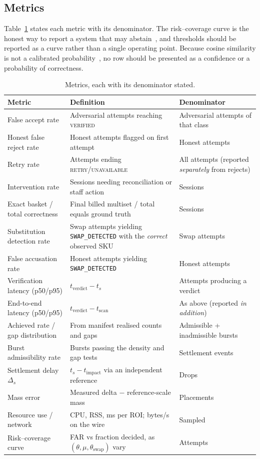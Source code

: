 \documentclass[conference]{IEEEtran}
\begin{document}
\subsection{Metrics}
Table~\ref{tab:metrics} states each metric with its denominator. The risk--coverage curve is the
honest way to report a system that may abstain~\cite{R61}, and thresholds should be reported as a
curve rather than a single operating point. Because cosine similarity is not a calibrated
probability~\cite{R60}, no row should be presented as a confidence or a probability of correctness.

\begin{table}[!t]
\caption{Metrics, each with its denominator stated.}
\label{tab:metrics}
\centering
\footnotesize
\renewcommand{\arraystretch}{1.15}
\begin{tabular}{@{}p{}p{}p{}@{}}
\toprule
Metric & Definition & Denominator \\
\midrule
False accept rate & Adversarial attempts reaching \textsc{verified} & Adversarial attempts of that class \\
Honest false reject rate & Honest attempts flagged on first attempt & Honest attempts \\
Retry rate & Attempts ending \textsc{retry}/\textsc{unavailable} & All attempts (reported \emph{separately} from rejects) \\
Intervention rate & Sessions needing reconciliation or staff action & Sessions \\
Exact basket / total correctness & Final billed multiset / total equals ground truth & Sessions \\
Substitution detection rate & Swap attempts yielding \texttt{SWAP\_DETECTED} with the \emph{correct} observed SKU & Swap attempts \\
False accusation rate & Honest attempts yielding \texttt{SWAP\_DETECTED} & Honest attempts \\
Verification latency (p50/p95) & $t_{\mathrm{verdict}}-t_s$ & Attempts producing a verdict \\
End-to-end latency (p50/p95) & $t_{\mathrm{verdict}}-t_{\mathrm{scan}}$ & As above (reported \emph{in addition}) \\
Achieved rate / gap distribution & From manifest realised counts and gaps & Admissible + inadmissible bursts \\
Burst admissibility rate & Bursts passing the density and gap tests & Settlement events \\
Settlement delay $\Delta_s$ & $t_s - t_{\mathrm{impact}}$ via an independent reference & Drops \\
Mass error & Measured delta $-$ reference-scale mass & Placements \\
Resource use / network & CPU, RSS, ms per ROI; bytes/s on the wire & Sampled \\
Risk--coverage curve & FAR vs fraction decided, as $(\theta,\mu,\theta_{\mathrm{swap}})$ vary & Attempts \\
\bottomrule
\end{tabular}
\end{table}
\end{document}
